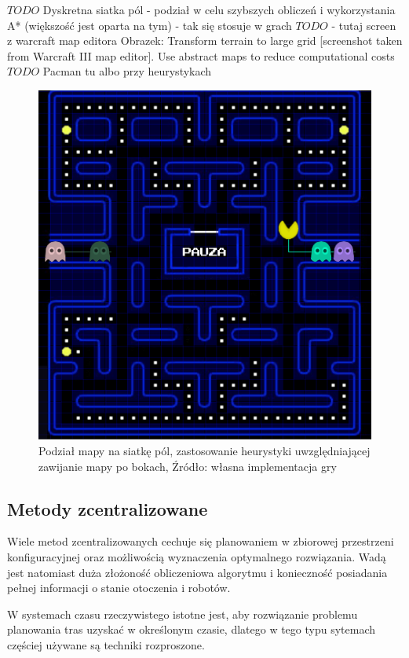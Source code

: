 $TODO$
Dyskretna siatka pól - podział w celu szybszych obliczeń i wykorzystania A* (większość jest oparta na tym) - tak się stosuje w grach
$TODO$ - tutaj screen z warcraft map editora
Obrazek: Transform terrain to large grid [screenshot taken from Warcraft III map editor]. \cite{hierpathfindinginrts}
Use abstract maps to reduce computational costs
$TODO$ Pacman tu albo przy heurystykach
\begin{figure}[H]
	\centering
	\includegraphics[width=13cm]{img/paclan1}
	\caption{Podział mapy na siatkę pól, zastosowanie heurystyki uwzględniającej zawijanie mapy po bokach, Źródło: własna implementacja gry}
	\label{fig:image_paclan1}
\end{figure}

\subsection{Metody zcentralizowane}
Wiele metod zcentralizowanych cechuje się planowaniem w zbiorowej przestrzeni konfiguracyjnej oraz możliwością wyznaczenia optymalnego rozwiązania.
Wadą jest natomiast duża złożoność obliczeniowa algorytmu i konieczność posiadania pełnej informacji o stanie otoczenia i robotów.

W systemach czasu rzeczywistego istotne jest, aby rozwiązanie problemu planowania tras uzyskać w określonym czasie, dlatego w tego typu sytemach częściej używane są techniki rozproszone.

